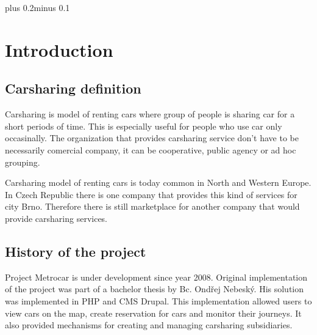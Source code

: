 \documentclass[11pt,twoside,a4paper]{book}
\begin{document}

\listoftables



\mainbodystarts
\normalfont
{}\baselineskip plus 0.2\baselineskip minus 0.1\baselineskip



% 
% 

\chapter{Introduction} \section{Carsharing definition} Carsharing is model of
renting cars where group of people is sharing car  for a short periods of
time. This is especially  useful for people who use car only occasinally. The
organization that provides carsharing service don't have to be necessarily
comercial company, it can be cooperative, public agency or ad hoc grouping\cite{wiki:carsharing}. 

Carsharing model of renting cars is today common in North and Western Europe. In Czech Republic 
there is one company that provides this kind of services for city Brno\cite{brno}. Therefore there is still marketplace 
for another company that would provide carsharing services. 
\section{History of the project}
Project Metrocar is under development since year 2008. Original implementation of the project was part 
of a bachelor thesis by Bc. Ondřej Nebeský. His solution was implemented in PHP and CMS Drupal. This implementation 
allowed users to view cars on the map, create reservation for cars and monitor their journeys. It also provided mechanisms 
for creating and managing carsharing subsidiaries\cite{Nebes09}. 
\end{document}
